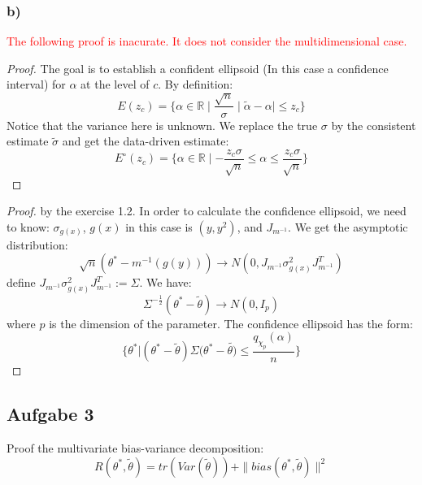 \documentclass[a4paper,11pt]{article}
\theoremstyle{definition}
\theoremstyle{remark}
\begin{document}
\subsubsection*{b)}
\textcolor{red}{The following proof is inacurate. It does not consider the multidimensional case.}
\begin{proof}
	The goal is to establish a confident ellipsoid (In this case a confidence interval) for $\alpha$ at the level of $c$. By definition:
\begin{equation}
	E(z_c) = \{ \alpha \in \mathbb{R}\mid \frac{\sqrt{n}}{\sigma} \mid \tilde{\alpha} - \alpha \mid \leq z_c\}
\end{equation}
Notice that the variance here is unknown. We replace the true $\sigma$ by the consistent estimate $\tilde{\sigma}$ and get the data-driven estimate:
\begin{equation*}
	E^\circ (z_c) = \{\alpha \in \mathbb{R} \mid -\frac{z_c \sigma}{\sqrt{n}} \leq \alpha \leq \frac{z_c\sigma}{\sqrt{n}}\}
\end{equation*}
\end{proof}

\begin{proof}
	by the exercise 1.2. In order to calculate the confidence ellipsoid, we need to know: $\sigma_{g(x)}$, $g(x)$ in this case is $(y, y^2)$, and $J_{m^{-1}}$. We get the asymptotic distribution:
	\begin{equation*}
		\sqrt{n}(\theta^* - m^{-1} (g(y)) ) \longrightarrow N(0, J_{m^{-1}} \sigma^2_{g(x)} J_{m^{-1}}^T)
	\end{equation*}
	define $J_{m^{-1}} \sigma^2_{g(x)} J_{m^{-1}}^T := \Sigma$. We have:
	\begin{equation*}
		\Sigma^{-\frac{1}{2}}(\theta^* - \tilde{\theta}) \longrightarrow N(0, I_p)
	\end{equation*}
	where $p$ is the dimension of the parameter. 
	The confidence ellipsoid has the form:
	\begin{equation*}
		\{\theta^* | (\theta^* - \tilde{\theta})\Sigma(\theta^* -\tilde{\theta)} \leq \frac{q_{\chi_p}(\alpha)}{n}\}
	\end{equation*}
\end{proof}


\subsection*{Aufgabe 3}
Proof the multivariate bias-variance decomposition:
\begin{equation*}
	R(\theta^*, \tilde{\theta}) = tr(Var(\tilde{\theta})) + \| bias(\theta^*, \tilde{\theta})\|^2
\end{equation*}
\end{document}
